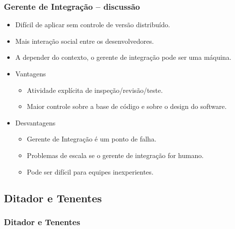 \documentclass{beamer}
\begin{document}
\begin{frame}
  \frametitle{Gerente de Integração -- discussão}
  \begin{itemize}
    \item Difícil de aplicar sem controle de versão distribuído.
    \item Mais interação social entre os desenvolvedores.
    \item A depender do contexto, o gerente de integração pode ser uma
      máquina.
    \item Vantagens
      \begin{itemize}
        \item<2-> Atividade explícita de inspeção/revisão/teste.
        \item<3-> Maior controle sobre a base de código e sobre o design
          do software.
      \end{itemize}
    \item Desvantagens
      \begin{itemize}
        \item<4-> Gerente de Integração é um ponto de falha.
        \item<5-> Problemas de escala se o gerente de integração for
          humano.
        \item<6-> Pode ser difícil para equipes inexperientes.
      \end{itemize}
  \end{itemize}
\end{frame}

\subsection{Ditador e Tenentes}

\begin{frame}
  \frametitle{Ditador e Tenentes}
  \begin{figure}[h]
    \begin{center}
    \end{center}
    \label{fig:dictator-and-lieutenants}
  \end{figure}
\end{frame}
\end{document}
